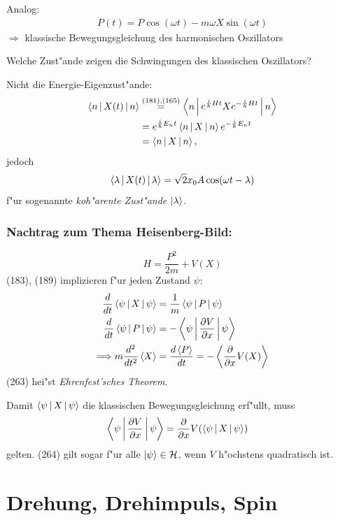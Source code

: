\documentclass[a4paper]{scrartcl}
\begin{document}
{Analog:
\begin{align}
P(t) = P \cos(\omega t) - m \omega X \sin(\omega t)
\end{align}
$\Longrightarrow$ klassische Bewegungsgleichung des harmonischen Oszillators

Welche Zust"ande zeigen die Schwingungen des klassischen Oszillators?

Nicht die Energie-Eigenzust"ande:
\begin{align*}
\Braket{ n | X(t) | n} & \stackrel{(181),(165)}= \Braket{n | e^{\frac i \hbar H t} X e^{- \frac i \hbar H t} | n } \\
& = e^{\frac i \hbar E_n t} \Braket{n | X | n } e^{- \frac i \hbar E_n t} \\
& = \Braket{ n | X | n },
\end{align*}
jedoch 
$$ \Braket{ \lambda | X(t) | \lambda} = \sqrt 2 x_0 A \cos(\omega t - \lambda)$$
f"ur sogenannte \emph{koh"arente Zust"ande} $\ket \lambda$.

\subsubsection*{Nachtrag zum Thema Heisenberg-Bild:}

$$H = \frac{P^2}{2m} + V(X)$$
(183), (189) implizieren f"ur jeden Zustand $\psi$:
\begin{align}
\frac d {dt} \Braket{ \psi | X | \psi} & = \frac 1m \Braket{ \psi | P | \psi} \notag \\
\frac d {dt} \Braket{ \psi | P |  \psi}  &  =  - \Braket{ \psi | \frac {\partial V}{\partial x} | \psi } \notag \\
\Longrightarrow m \frac{d^2}{dt^2} \Braket{X} & =  \frac{d \Braket P }{ d t} = - \Braket{ \frac \partial {\partial x} V(X)}
\end{align}
(263) hei"st \emph{Ehrenfest'sches Theorem}.

Damit $\Braket {\psi | X | \psi}$ die klassischen Bewegungsgleichung erf"ullt, muss
\begin{align}
\Braket{\psi | \frac{\partial V}{\partial x} | \psi} & = \frac{\partial}{\partial x} V(\Braket{ \psi | X | \psi})
\end{align}
gelten. (264) gilt sogar f"ur alle $\ket \psi \in \mathcal H$, wenn $V$ h"ochstens quadratisch ist.

\section{Drehung, Drehimpuls, Spin}

}
\end{document}
